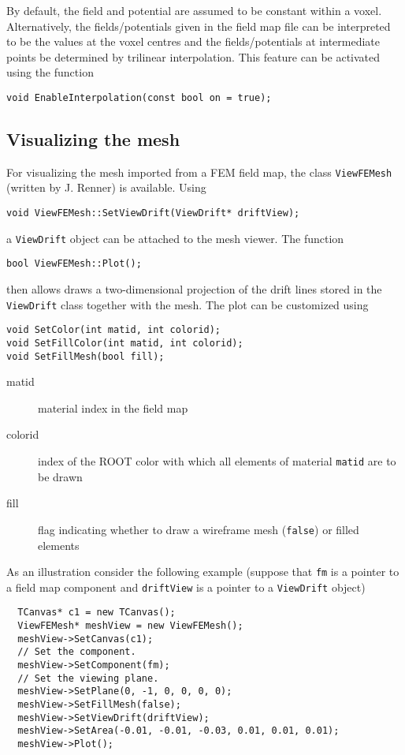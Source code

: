 By default, the field and potential are assumed to be constant within 
a voxel. Alternatively, the fields/potentials given in the field map file
can be interpreted to be the values at the voxel centres and the 
fields/potentials at intermediate points be determined by trilinear interpolation.
This feature can be activated using the function
\begin{lstlisting}
void EnableInterpolation(const bool on = true);
\end{lstlisting} 
 
\subsection{Visualizing the mesh}

For visualizing the mesh imported from a FEM field map, the class 
\texttt{ViewFEMesh} (written by J. Renner) is available. 
Using 
\begin{lstlisting}
void ViewFEMesh::SetViewDrift(ViewDrift* driftView);
\end{lstlisting}
a \texttt{ViewDrift} object can be attached to the mesh viewer. 
The function
\begin{lstlisting}
bool ViewFEMesh::Plot();
\end{lstlisting}
then allows draws a two-dimensional projection of the drift lines stored in the  
\texttt{ViewDrift} class together with the mesh. 
The plot can be customized using 
\begin{lstlisting}
void SetColor(int matid, int colorid);
void SetFillColor(int matid, int colorid);
void SetFillMesh(bool fill);
\end{lstlisting}
\begin{description}
  \item[matid] material index in the field map
  \item[colorid] index of the ROOT color with which all elements of material 
                 \texttt{matid} are to be drawn 
  \item[fill] flag indicating whether to draw a wireframe mesh (\texttt{false}) 
              or filled elements
\end{description}
As an illustration consider the following example 
(suppose that \texttt{fm} is a pointer to a field map component 
and \texttt{driftView} is a pointer to a \texttt{ViewDrift} object) 
\begin{lstlisting}
  TCanvas* c1 = new TCanvas();
  ViewFEMesh* meshView = new ViewFEMesh();
  meshView->SetCanvas(c1);
  // Set the component.
  meshView->SetComponent(fm);
  // Set the viewing plane.
  meshView->SetPlane(0, -1, 0, 0, 0, 0);
  meshView->SetFillMesh(false);
  meshView->SetViewDrift(driftView);
  meshView->SetArea(-0.01, -0.01, -0.03, 0.01, 0.01, 0.01);
  meshView->Plot();
\end{lstlisting}

